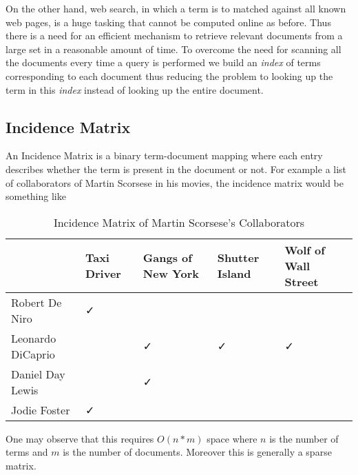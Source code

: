 On the other hand, web search, in which a term is to matched against all known web pages, is a huge tasking that cannot be computed online as before.
Thus there is a need for an efficient mechanism to retrieve relevant documents from a large set in a reasonable amount of time.
To overcome the need for scanning all the documents every time a query is performed we build an \textit{index} of terms corresponding to
each document thus reducing the problem to looking up the term in this \textit{index} instead of looking up the entire document.

\subsection{Incidence Matrix}
An Incidence Matrix is a binary term-document mapping where each entry describes whether the term is present in the document or not.
For example a list of collaborators of Martin Scorsese in his movies, the incidence matrix would be something like

\begin{table}[ht]
  \caption{Incidence Matrix of Martin Scorsese's Collaborators}
  \centering
  \begin{tabular}{p{4cm}p{2cm}p{2cm}p{2cm}p{2cm}}
    \hline \hline
                      & Taxi Driver & Gangs of New York & Shutter Island & Wolf of Wall Street  \\
    \hline
    Robert De Niro    &      ✓      &                   &                &                      \\
    Leonardo DiCaprio &             &        ✓          &         ✓      &           ✓          \\
    Daniel Day Lewis  &             &        ✓          &                &                      \\
    Jodie Foster      &      ✓      &                   &                &                      \\
  \end{tabular}
\end{table}

One may observe that this requires $O(n*m)$ space where $n$ is the number of terms and $m$ is the number of documents.
Moreover this is generally a sparse matrix.

